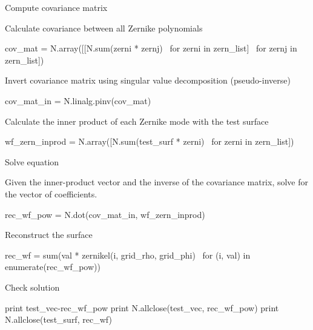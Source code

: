 \documentclass[xetex,10pt]{beamer}
\def\spacer{\vspace*{1em}}
\begin{document}
\begin{frame}[fragile]{Compute covariance matrix}

Calculate covariance between all Zernike polynomials

\spacer

\begin{pythonln}[firstnumber=105]
cov_mat = N.array([[N.sum(zerni * zernj) \
  for zerni in zern_list] \
    for zernj in zern_list])
\end{pythonln}

\spacer
\pause
Invert covariance matrix using singular value decomposition (pseudo-inverse)

\spacer

\begin{pythonln}[firstnumber=108]
cov_mat_in = N.linalg.pinv(cov_mat)
\end{pythonln}

\spacer
\pause
Calculate the inner product of each Zernike mode with the test surface

\spacer

\begin{pythonln}[firstnumber=112]
wf_zern_inprod = N.array([N.sum(test_surf * zerni) \
  for zerni in zern_list])
\end{pythonln}


\end{frame}

\begin{frame}[fragile]{Solve equation}

Given the inner-product vector and the inverse of the covariance matrix, solve for the vector of coefficients.

\begin{pythonln}[firstnumber=117]
rec_wf_pow = N.dot(cov_mat_in, wf_zern_inprod)
\end{pythonln}

\spacer
\pause
Reconstruct the surface
\begin{pythonln}[firstnumber=117]
rec_wf = sum(val * zernikel(i, grid_rho, grid_phi) \
  for (i, val) in enumerate(rec_wf_pow))
\end{pythonln}

\spacer
\pause
Check solution
\begin{pythonln}[firstnumber=123]
print test_vec-rec_wf_pow
print N.allclose(test_vec, rec_wf_pow)
print N.allclose(test_surf, rec_wf)
\end{pythonln}

\end{frame}
\end{document}
